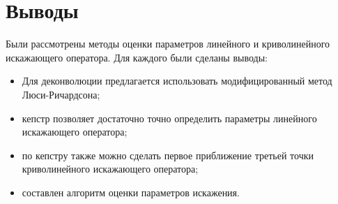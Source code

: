\section{Выводы}
Были рассмотрены методы оценки параметров линейного и криволинейного искажающего оператора. Для каждого были сделаны выводы:
\begin{itemize}
	\item Для деконволюции предлагается использовать модифицированный метод Люси-Ричардсона;
	\item кепстр позволяет достаточно точно определить параметры линейного искажающего оператора;
	\item по кепстру также можно сделать первое приближение третьей точки криволинейного искажающего оператора;
	\item составлен алгоритм оценки параметров искажения.
\end{itemize}